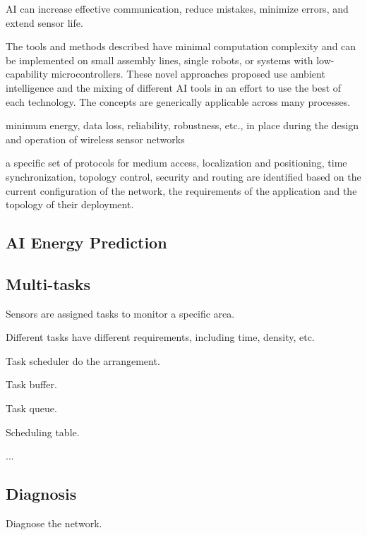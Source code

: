 AI can increase effective communication, reduce mistakes, minimize errors, and extend sensor life.



The tools and methods described have minimal computation complexity and can be implemented on small assembly lines, single robots, or systems with low-capability microcontrollers. These novel approaches proposed use ambient intelligence and the mixing of different AI tools in an effort to use the best of each technology. The concepts are generically applicable across many processes.


minimum energy, data loss, reliability, robustness, etc., in place during the design and operation of wireless sensor networks

a specific set of protocols for medium access, localization and positioning, time synchronization, topology control, security and routing are identified based on the current configuration of the network, the requirements of the application and the topology of their deployment.

\subsection{AI Energy Prediction}

\subsection{Multi-tasks}
Sensors are assigned tasks to monitor a specific area.

Different tasks have different requirements, including time, density, etc.

Task scheduler do the arrangement. 

Task buffer.

Task queue.

Scheduling table.

...

\subsection{Diagnosis}

Diagnose the network.
